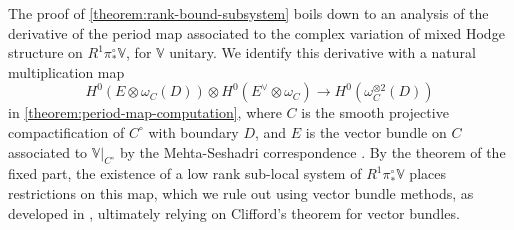 \documentclass[12 pt]{amsart}
\theoremstyle{plain}
\theoremstyle{definition}
\theoremstyle{remark}
\numberwithin{equation}{section}
\begin{document}
The proof of
\autoref{theorem:rank-bound-subsystem} boils down to an analysis of the derivative of the period map associated to the complex variation of mixed Hodge structure on $R^1\pi^\circ_*\mathbb{V}$, for $\mathbb{V}$ unitary.
We identify this derivative with a natural multiplication map $$H^0(E\otimes \omega_C(D))\otimes H^0(E^\vee\otimes \omega_C)\to H^0(\omega_C^{\otimes 2}(D))$$ in
\autoref{theorem:period-map-computation}, where $C$ is the smooth projective compactification of $C^\circ$ with boundary $D$, and $E$ is the vector bundle on $C$ associated to $\mathbb{V}|_{C^\circ}$ by the Mehta-Seshadri correspondence \cite{mehta1980moduli}. By the theorem of the fixed part, the existence of a low rank sub-local system of $R^1\pi_*^\circ\mathbb{V}$ places restrictions on this map, which we rule out
 using vector bundle methods,
as developed in \cite[\S6]{LL:geometric-local-systems},
ultimately relying on Clifford's theorem for vector bundles.
\end{document}
